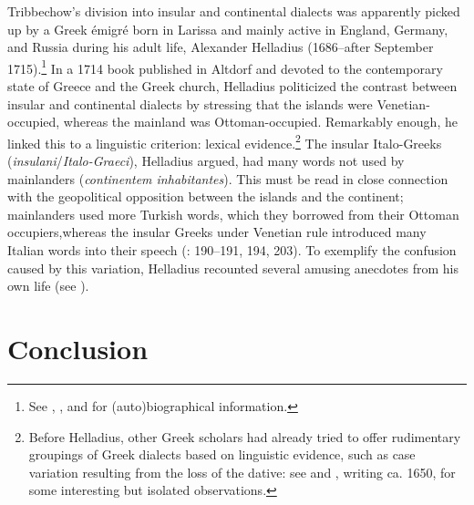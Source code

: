 Tribbechow’s division into insular and continental dialects was apparently picked up by a Greek émigré born in Larissa and mainly active in England, Germany, and Russia during his adult life, Alexander Helladius (1686–after September 1715).\footnote{See \citet{Helladius1714}, \citet[315--317]{Moennig1998}, and \citet{VanRooyFca} for (auto)biographical information.} In a 1714 book published in Altdorf and devoted to the contemporary state of Greece and the Greek church, Helladius politicized the contrast between insular and continental dialects by stressing that the islands were Venetian-oc\-cu\-pied, whereas the mainland was Ottoman-occupied. Remarkably enough, he linked this to a linguistic criterion: lexical evidence.\footnote{Before Helladius, other Greek scholars had already tried to offer rudimentary groupings of  Greek dialects based on linguistic evidence, such as case variation resulting from the loss of the dative: see \citet[108]{Kritopoulos1924} and \citet[e.g. 1 \& 8]{Nikiforos1908}, writing ca. 1650, for some interesting but isolated observations.} The insular Italo-Greeks (\textit{insulani}/\textit{Italo-Graeci}), Helladius argued, had many words not used by mainlanders (\textit{continentem inhabitantes}). This must be read in close connection with the geopolitical opposition between the islands and the continent; mainlanders used more Turkish words, which they borrowed from their Ottoman occupiers,\linebreak whereas the insular Greeks under Venetian rule introduced many Italian words into their speech (\citealt{Helladius1714}: 190–191, 194, 203). To exemplify the confusion caused by this  variation, Helladius recounted several amusing anecdotes from his own life (see \citet{VanRooyFca}).

\section{Conclusion}\label{sec:2.11}

